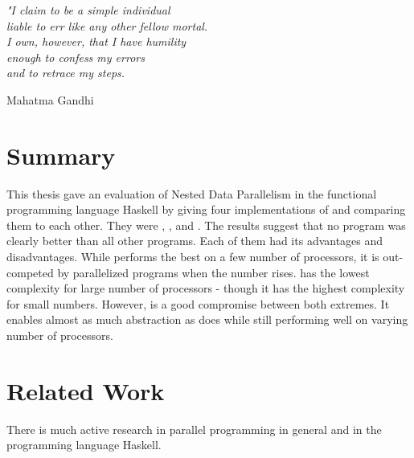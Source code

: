 

\epigraph{\emph{
"I claim to be a simple individual \\
liable to err like any other fellow mortal. \\
I own, however, that I have humility \\
enough to confess my errors \\
and to retrace my steps.
}}{
Mahatma Gandhi
}

\section{Summary}
  This thesis gave an evaluation of Nested Data Parallelism in
  the functional programming language Haskell by giving
  four implementations of \algo and comparing them to each other.
  They were \seq, \man, \ndpn and \ndpv. The results suggest
  that no program was clearly better than all
  other programs. Each of them had its advantages and disadvantages.
  While \seq performs the best on a few number of processors,
  it is out-competed by parallelized programs when the number rises.
  \man has the lowest complexity for large number
  of processors - though it has the highest complexity for small numbers.
  However, \ndpv is a good compromise between both extremes.
  It enables almost as much abstraction as does \seq
  while still performing well on varying number of processors.
  

\section{Related Work}
  There is much active research in parallel programming
  in general and in the programming language Haskell.
  
